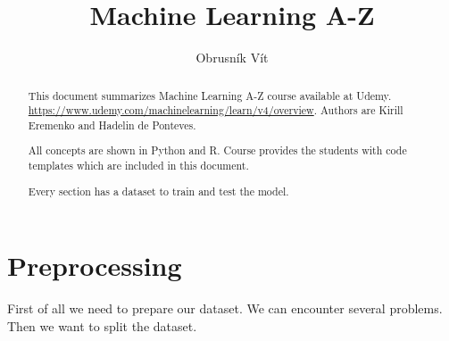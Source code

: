 \documentclass[runningheads,a4paper]{llncs}
\begin{document}
\mainmatter 

\title{Machine Learning A-Z}


\author{Obrusník Vít}



\toctitle{}
\tocauthor{{}}

\maketitle

\begin{abstract}
This document summarizes Machine Learning A-Z course available at Udemy. \url{https://www.udemy.com/machinelearning/learn/v4/overview}. Authors are Kirill Eremenko and Hadelin de Ponteves.

All concepts are shown in Python and R. Course provides the students with code templates which are included in this document.

Every section has a dataset to train and test the model.
\end{abstract}

\medskip

\begingroup
\let\clearpage\relax
\tableofcontents
{}
\endgroup

\medskip
\medskip

\section{Preprocessing}
First of all we need to prepare our dataset. We can encounter several problems. Then we want to split the dataset.
\end{document}
